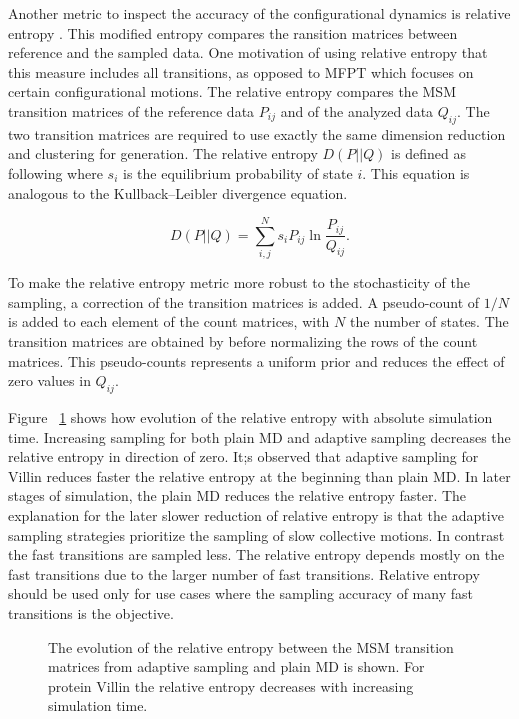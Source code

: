 Another metric to inspect the accuracy of the configurational dynamics is relative entropy \cite{bowman2010enhanced}. This modified entropy compares the ransition matrices between reference and the sampled data. One motivation of using relative entropy that this measure includes all transitions, as opposed to MFPT which focuses on certain configurational motions. 
The relative entropy compares the MSM transition matrices of the reference data $P_{ij}$ and of the analyzed data $Q_{ij}$. The two transition matrices are required to use exactly the same dimension reduction and clustering for generation. The relative entropy $D(P||Q)$ is defined as following where $s_{i}$ is the equilibrium probability of state $i$. This equation is analogous to the Kullback–Leibler divergence equation.

\begin{equation}
D(P||Q)=\sum_{i,j}^{N}s_{i}P_{ij}\ln\frac{P_{ij}}{Q_{ij}}. 
\end{equation}

To make the relative entropy metric more robust to the stochasticity of the sampling, a correction of the transition matrices is added. A pseudo-count of $1/N$ is added to each element of the count matrices, with $N$ the number of states. The transition matrices are obtained by before normalizing the rows of the count matrices. This pseudo-counts represents a uniform prior and reduces the effect of zero values in $Q_{ij}$.

Figure ~\ref{fig:rel_ent} shows how evolution of the relative entropy with absolute simulation time. Increasing sampling for both plain MD and adaptive sampling decreases the relative entropy in direction of zero. It;s observed that adaptive sampling for Villin reduces faster the relative entropy at the beginning than plain MD. In later stages of simulation, the plain MD reduces the relative entropy faster. The explanation for the later slower reduction of relative entropy is that the adaptive sampling strategies prioritize the sampling of slow collective motions. In contrast the fast transitions are sampled less. The relative entropy depends mostly on the fast transitions due to the larger number of fast transitions. Relative entropy should be used only for use cases where the sampling accuracy of many fast transitions is the objective.

\begin{figure}[H]
   \centering
   \begin{subfigure}[b]{0.7\linewidth}
   {}
   \end{subfigure}%
   
  \caption{
  The evolution of the relative entropy between the MSM transition matrices from adaptive sampling and plain MD is shown.  For protein Villin the relative entropy decreases with increasing simulation time.}
  \label{fig:rel_ent}
\end{figure}


